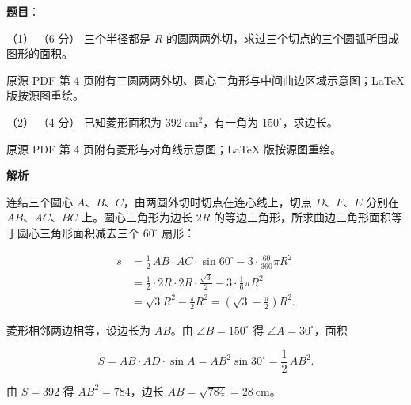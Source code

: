 \begin{answer}

\textbf{题目}：

（1） （6 分） 三个半径都是 $R$ 的圆两两外切，求过三个切点的三个圆弧所围成图形的面积。

\begin{gktip}
原源 PDF 第 4 页附有三圆两两外切、圆心三角形与中间曲边区域示意图；LaTeX 版按源图重绘。
\end{gktip}
\nopagebreak[4]
\begin{center}\end{center}
\nopagebreak[4]
（2） （4 分） 已知菱形面积为 $392\ \mathrm{cm^2}$，有一角为 $150^\circ$，求边长。

\begin{gktip}
原源 PDF 第 4 页附有菱形与对角线示意图；LaTeX 版按源图重绘。
\end{gktip}
\nopagebreak[4]
\begin{center}\end{center}
\nopagebreak[4]
\textbf{解析}


连结三个圆心 $A\text{、}B\text{、}C$，由两圆外切时切点在连心线上，切点 $D\text{、}F\text{、}E$ 分别在 $AB\text{、}AC\text{、}BC$ 上。圆心三角形为边长 $2R$ 的等边三角形，所求曲边三角形面积等于圆心三角形面积减去三个 $60^\circ$ 扇形：

\nopagebreak[4]
\[
\begin{aligned}
s&=\frac12\,AB\cdot AC\cdot\sin60^\circ-3\cdot\frac{60}{360}\pi R^2\\
&=\frac12\cdot2R\cdot2R\cdot\frac{\sqrt3}{2}-3\cdot\frac16\pi R^2\\
&=\sqrt3 R^2-\frac{\pi}{2}R^2
=\left(\sqrt3-\frac{\pi}{2}\right)R^2.
\end{aligned}
\]
\nopagebreak[4]
\begin{center}\end{center}
\nopagebreak[4]

菱形相邻两边相等，设边长为 $AB$。由 $\angle B=150^\circ$ 得 $\angle A=30^\circ$，面积

\nopagebreak[4]
\[
S=AB\cdot AD\cdot\sin A=AB^2\sin30^\circ=\frac12\,AB^2.
\]

由 $S=392$ 得 $AB^2=784$，边长 $AB=\sqrt{784}=28\ \mathrm{cm}$。
\nopagebreak[4]
\begin{center}\end{center}
\nopagebreak[4]


\end{answer}
